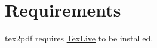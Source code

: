 \section{Requirements}

tex2pdf requires \href{https://tug.org/texlive/}{TexLive} to be installed.


